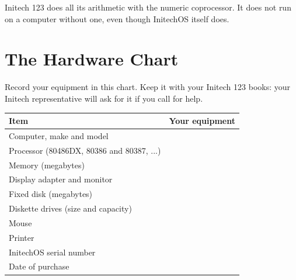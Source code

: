 \begin{Note}
Initech 123 does all its arithmetic with the numeric coprocessor.  It does
not run on a computer without one, even though InitechOS itself does.
\end{Note}

\section{The Hardware Chart}
Record your equipment in this chart.  Keep it with your Initech 123 books:
your Initech representative will ask for it if you call for help.

\par\addvspace{6pt}
\noindent\begin{tabular}{@{}p{58mm}p{69mm}@{}}
\hline
\sffamily\small\textbf{Item} & \sffamily\small\textbf{Your equipment}\\
\hline
\rule{0pt}{14pt}Computer, make and model & \\ \hline
\rule{0pt}{14pt}Processor (80486DX, 80386 and 80387, ...) & \\ \hline
\rule{0pt}{14pt}Memory (megabytes) & \\ \hline
\rule{0pt}{14pt}Display adapter and monitor & \\ \hline
\rule{0pt}{14pt}Fixed disk (megabytes) & \\ \hline
\rule{0pt}{14pt}Diskette drives (size and capacity) & \\ \hline
\rule{0pt}{14pt}Mouse & \\ \hline
\rule{0pt}{14pt}Printer & \\ \hline
\rule{0pt}{14pt}InitechOS serial number & \\ \hline
\rule{0pt}{14pt}Date of purchase & \\ \hline
\end{tabular}
